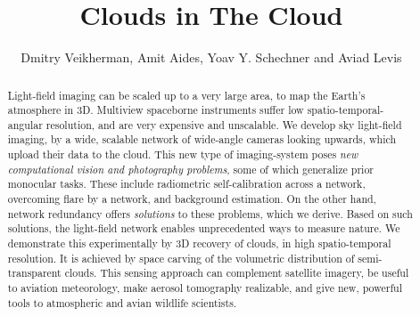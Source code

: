 \documentclass[runningheads]{llncs}
\begin{document}
\newcommand{\point}{
    \raise0.7ex\hbox{.}
    }


\pagestyle{headings}

\mainmatter



\title{Clouds in The Cloud} %



\author{Dmitry Veikherman, Amit Aides, Yoav Y. Schechner and Aviad Levis} %
\maketitle

\begin{abstract}
Light-field imaging can be scaled up to a very large area, to map the Earth's atmosphere in 3D. Multiview spaceborne instruments suffer low spatio-temporal-angular resolution, and are very expensive and unscalable. We develop sky light-field imaging, by a wide, scalable network of wide-angle cameras  looking upwards, which upload their data to the cloud. This new type of imaging-system poses {\em new computational vision and photography problems}, some of which generalize prior monocular tasks. These include radiometric self-calibration across a network, overcoming flare by a network, and background estimation. On the other hand, network redundancy offers {\em solutions} to these problems, which we derive. Based on such solutions, the light-field network enables unprecedented ways to measure nature. We demonstrate this experimentally by 3D recovery of clouds, in high spatio-temporal resolution. It is achieved by space carving of the volumetric distribution of semi-transparent clouds. This sensing approach can complement satellite imagery, be useful to aviation meteorology, make aerosol tomography realizable, and give new, powerful tools to atmospheric and avian wildlife scientists.

\end{abstract}
\end{document}
